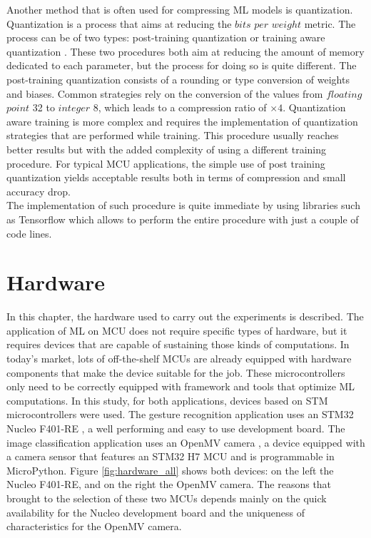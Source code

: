 \documentclass[12pt]{report}
\begin{document}
Another method that is often used for compressing ML models is quantization. Quantization is a process that aims at reducing the $bits$ $per$ $weight$ metric. The process can be of two types: post-training quantization or training aware quantization \cite{pruning_article}. These two procedures both aim at reducing the amount of memory dedicated to each parameter, but the process for doing so is quite different. The post-training quantization consists of a rounding or type conversion of weights and biases. Common strategies rely on the conversion of the values from $floating$ $point$ 32 to $integer$ 8, which leads to a compression ratio of $\times 4$. Quantization aware training is more complex and requires the implementation of quantization strategies that are performed while training. This procedure usually reaches better results but with the added complexity of using a different training procedure. For typical MCU applications, the simple use of post training quantization yields acceptable results both in terms of compression and small accuracy drop. \\
The implementation of such procedure is quite immediate by using libraries such as Tensorflow \cite{tensorflow_quantization} which allows to perform the entire procedure with just a couple of code lines.

\chapter{Hardware} 
\label{hardware}
In this chapter, the hardware used to carry out the experiments is described. The application of ML on MCU does not require specific types of hardware, but it requires devices that are capable of sustaining those kinds of computations. In today's market, lots of off-the-shelf MCUs are already equipped with hardware components that make the device suitable for the job. These microcontrollers only need to be correctly equipped with framework and tools that optimize ML computations. In this study, for both applications, devices based on STM microcontrollers were used. The gesture recognition application uses an STM32 Nucleo F401-RE \cite{nucleo_datasheet}, a well performing and easy to use development board. The image classification application uses an OpenMV camera \cite{openmv_datasheet}, a device equipped with a camera sensor that features an STM32 H7 MCU and is programmable in MicroPython. Figure \ref{fig:hardware_all} shows both devices: on the left the Nucleo F401-RE, and on the right the OpenMV camera. The reasons that brought to the selection of these two MCUs depends mainly on the quick availability for the Nucleo development board and the uniqueness of characteristics for the OpenMV camera.
\end{document}

